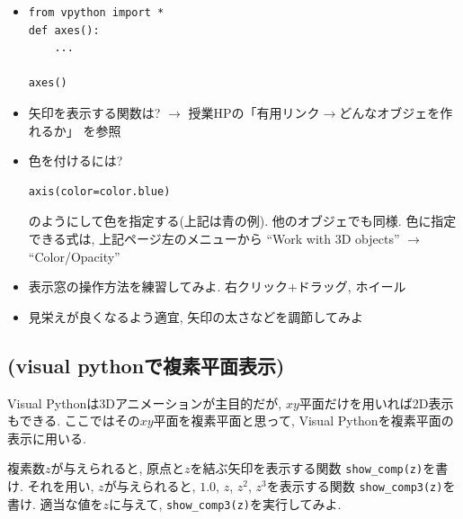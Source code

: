 \documentclass[10pt,dvipdfmx]{article}
\begin{document}
\begin{itemize}
\item []
\begin{lstlisting}
from vpython import *
def axes():
    ...

axes()
\end{lstlisting}
\end{itemize}

\begin{itemize}
\item 矢印を表示する関数は?
  $\rightarrow$ 授業HPの「有用リンク$\rightarrow$どんなオブジェを作れるか」
  を参照
\item 色を付けるには? 
\begin{lstlisting}
axis(color=color.blue)    
\end{lstlisting}
のようにして色を指定する(上記は青の例). 他のオブジェでも同様.
色に指定できる式は, 上記ページ左のメニューから
``Work with 3D objects'' $\rightarrow$ ``Color/Opacity''
\item 表示窓の操作方法を練習してみよ.
  右クリック$+$ドラッグ, ホイール
\item 見栄えが良くなるよう適宜, 矢印の太さなどを調節してみよ
\end{itemize}

\iffalse
\subsection{{\scriptsize (visual pythonで複素平面表示)}}
Visual Pythonは3Dアニメーションが主目的だが, 
$xy$平面だけを用いれば2D表示もできる.
ここではその$xy$平面を複素平面と思って, 
Visual Pythonを複素平面の表示に用いる.

複素数$z$が与えられると, 原点と$z$を結ぶ矢印を表示する関数
{\tt show\_comp(z)}を書け. それを用い, $z$が与えられると,
$1.0$, $z$, $z^2$, $z^3$を表示する関数
{\tt show\_comp3(z)}を書け. 適当な値を$z$に与えて, 
{\tt show\_comp3(z)}を実行してみよ. 
\end{document}
